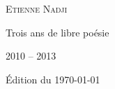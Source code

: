 \begin{center}
  {\Huge \textsc{Etienne Nadji}}
\end{center}

\vspace{2ex}
\begin{center}
  {\Huge Trois ans de libre poésie}
\end{center}

\vfill
\begin{center}
  {\large 2010 -- 2013}
  
  Édition du \today
\end{center}
\newpage
